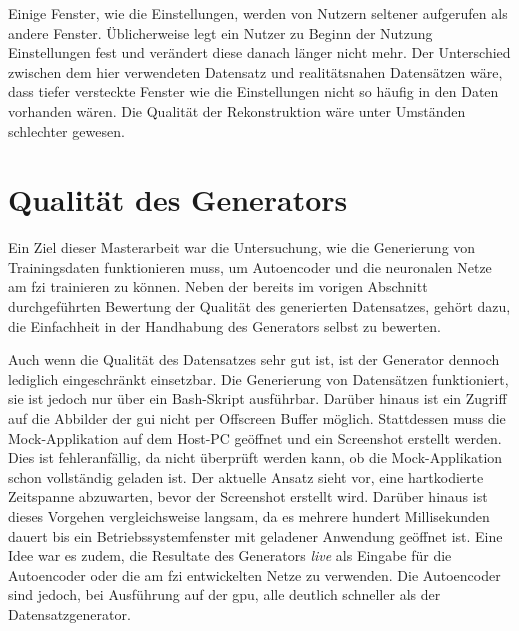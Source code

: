 Einige Fenster, wie die Einstellungen, werden von Nutzern seltener aufgerufen als andere Fenster. Üblicherweise legt ein Nutzer zu Beginn der Nutzung Einstellungen fest und verändert diese danach länger nicht mehr. Der Unterschied zwischen dem hier verwendeten Datensatz und realitätsnahen Datensätzen wäre, dass tiefer versteckte Fenster wie die Einstellungen nicht so häufig in den Daten vorhanden wären. Die Qualität der Rekonstruktion wäre unter Umständen schlechter gewesen.


\section{Qualität des Generators}
Ein Ziel dieser Masterarbeit war die Untersuchung, wie die Generierung von Trainingsdaten funktionieren muss, um Autoencoder und die neuronalen Netze am \gls{fzi} trainieren zu können. Neben der bereits im vorigen Abschnitt durchgeführten Bewertung der Qualität des generierten Datensatzes, gehört dazu, die Einfachheit in der Handhabung des Generators selbst zu bewerten.

Auch wenn die Qualität des Datensatzes sehr gut ist, ist der Generator dennoch lediglich eingeschränkt einsetzbar. Die Generierung von Datensätzen funktioniert, sie ist jedoch nur über ein Bash-Skript ausführbar. Darüber hinaus ist ein Zugriff auf die Abbilder der \gls{gui} nicht per Offscreen Buffer möglich. Stattdessen muss die Mock-Applikation auf dem Host-PC geöffnet und ein Screenshot erstellt werden. Dies ist fehleranfällig, da nicht überprüft werden kann, ob die Mock-Applikation schon vollständig geladen ist. Der aktuelle Ansatz sieht vor, eine hartkodierte Zeitspanne abzuwarten, bevor der Screenshot erstellt wird. Darüber hinaus ist dieses Vorgehen vergleichsweise langsam, da es mehrere hundert Millisekunden dauert bis ein Betriebssystemfenster mit geladener Anwendung geöffnet ist. Eine Idee war es zudem, die Resultate des Generators \emph{live} als Eingabe für die Autoencoder oder die am \gls{fzi} entwickelten Netze zu verwenden. Die Autoencoder sind jedoch, bei Ausführung auf der \gls{gpu}, alle deutlich schneller als der Datensatzgenerator.

